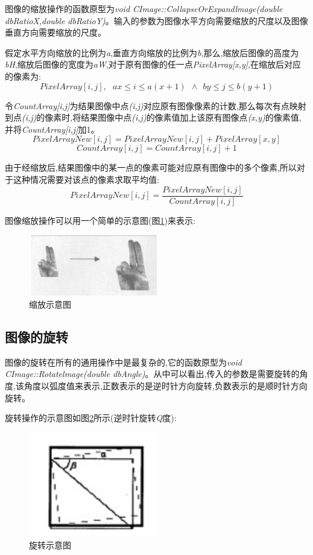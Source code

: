 \documentclass{XDBAthesis}
\begin{document}
    图像的缩放操作的函数原型为\emph{void CImage::CollapseOrExpandlmage(double dbRatioX,double dbRatioY)}\cite{殷涛2004基于几何矩的手势识别算法}。输入的参数为图像水平方向需要缩放的尺度以及图像垂直方向需要缩放的尺度。

假定水平方向缩放的比例为\emph{a},垂直方向缩放的比例为\emph{b},那么,缩放后图像的高度为\emph{bH},缩放后图像的宽度为\emph{aW},对于原有图像的任一点\emph{PixelArray[x,y]},在缩放后对应的像素为:
$$
    PixelArray[i,j] ,\ \ \ ax\leq i \leq a(x+1) \ \ \wedge\ \  by \leq j \leq b(y+1)
$$


    令\emph{CountArray[i,j]}为结果图像中点\emph{(i,j)}对应原有图像像素的计数,那么每次有点映射到点\emph{(i,j)}的像素时,将结果图像中点\emph{(i,j)}的像素值加上该原有图像点\emph{(x,y)}的像素值,并将\emph{CountArray[i,j]}加1。
$$
    PixelArrayNew[i,j]=PixelArrayNew[i,j]+PixelArray[x,y]
$$
$$
    CountArray[i,j]=CountArray[i,j]+1
$$

由于经缩放后,结果图像中的某一点的像素可能对应原有图像中的多个像素,所以对于这种情况需要对该点的像素求取平均值:
$$
    PixelArrayNew[i,j]=\frac{PixelArrayNew[i,j]}{CountArray[i,j]} %
$$


    图像缩放操作可以用一个简单的示意图(图\ref{fg:ss})来表示:
    
\begin{figure}[htb]
    \centering
    \includegraphics[width=0.5\textwidth]{figure/suofang}
    \caption{缩放示意图}
    \label{fg:ss}
\end{figure}

\subsection{图像的旋转}

    图像的旋转在所有的通用操作中是最复杂的,它的函数原型为\emph{void CImage::Rotatelmage(double dbAngle)}。从中可以看出,传入的参数是需要旋转的角度,该角度以弧度值来表示,正数表示的是逆时针方向旋转,负数表示的是顺时针方向旋转。

旋转操作的示意图如图\ref{fg:roat}所示(逆时针旋转\emph{Q}度):
\begin{figure}[htb]
    \centering
    \includegraphics[width=0.5\textwidth]{figure/roat}
    \caption{旋转示意图}
    \label{fg:roat}
\end{figure}
      
\end{document}
